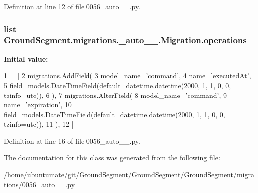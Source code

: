 Definition at line 12 of file 0056\+\_\+auto\+\_\+\_.\+py.

\hypertarget{class_ground_segment_1_1migrations_1_10056__auto__20170327__1906_1_1_migration_a09dc6cfe21cc73dc107f94d34e80464b}{}
\subsubsection[{operations}]{\setlength{\rightskip}{0pt plus 5cm}list Ground\+Segment.\+migrations.\+\_\+auto\+\_\+\_.\+Migration.\+operations\hspace{0.3cm}{\ttfamily [static]}}\label{class_ground_segment_1_1migrations_1_10056__auto__20170327__1906_1_1_migration_a09dc6cfe21cc73dc107f94d34e80464b}
{\bfseries Initial value\+:}
\begin{DoxyCode}
1 = [
2         migrations.AddField(
3             model\_name=\textcolor{stringliteral}{'command'},
4             name=\textcolor{stringliteral}{'executedAt'},
5             field=models.DateTimeField(default=datetime.datetime(2000, 1, 1, 0, 0, tzinfo=utc)),
6         ),
7         migrations.AlterField(
8             model\_name=\textcolor{stringliteral}{'command'},
9             name=\textcolor{stringliteral}{'expiration'},
10             field=models.DateTimeField(default=datetime.datetime(2000, 1, 1, 0, 0, tzinfo=utc)),
11         ),
12     ]
\end{DoxyCode}


Definition at line 16 of file 0056\+\_\+auto\+\_\+\_.\+py.



The documentation for this class was generated from the following file\+:\begin{DoxyCompactItemize}
\item 
/home/ubuntumate/git/\+Ground\+Segment/\+Ground\+Segment/\+Ground\+Segment/migrations/\hyperlink{0056__auto__20170327__1906_8py}{0056\+\_\+auto\+\_\+\_.\+py}\end{DoxyCompactItemize}
